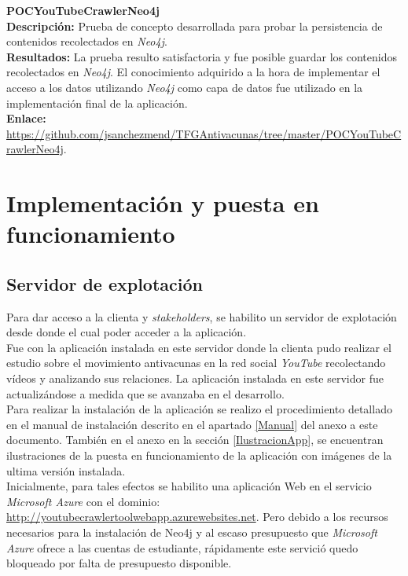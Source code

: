 \documentclass[11pt,a4paper]{article}
\begin{document}
\noindent\textbf{POCYouTubeCrawlerNeo4j}\\
\textbf{Descripción:} Prueba de concepto desarrollada para probar la persistencia de contenidos recolectados en \textit{Neo4j}.\\
\textbf{Resultados:} La prueba resulto satisfactoria y fue posible guardar los contenidos recolectados en \textit{Neo4j}. El conocimiento adquirido a la hora de implementar el acceso a los datos utilizando \textit{Neo4j} como capa de datos fue utilizado en la implementación final de la aplicación.\\
\textbf{Enlace:} \url{https://github.com/jsanchezmend/TFGAntivacunas/tree/master/POCYouTubeCrawlerNeo4j}.
\\

\newpage 


\section{Implementación y puesta en funcionamiento}
\bigskip 

\subsection{Servidor de explotación}
Para dar acceso a la clienta y \textit{stakeholders}, se habilito un servidor de explotación desde donde el cual poder acceder a la aplicación.
\\

Fue con la aplicación instalada en este servidor donde la clienta pudo realizar el estudio sobre el movimiento antivacunas en la red social \textit{YouTube} recolectando vídeos y analizando sus relaciones. La aplicación instalada en este servidor fue actualizándose a medida que se avanzaba en el desarrollo.
\\

Para realizar la instalación de la aplicación se realizo el procedimiento detallado en el manual de instalación descrito en el apartado \ref{Manual} del anexo a este documento. También en el anexo en la sección \ref{IlustracionApp}, se encuentran ilustraciones de la puesta en funcionamiento de la aplicación con imágenes de la ultima versión instalada.
\\

Inicialmente, para tales efectos se habilito una aplicación Web en el servicio \textit{Microsoft Azure} con el dominio: \url{http://youtubecrawlertoolwebapp.azurewebsites.net}. Pero debido a los recursos necesarios para la instalación de Neo4j y al escaso presupuesto que \textit{Microsoft Azure} ofrece a las cuentas de estudiante, rápidamente este servició quedo bloqueado por falta de presupuesto disponible.
\\
\end{document}
